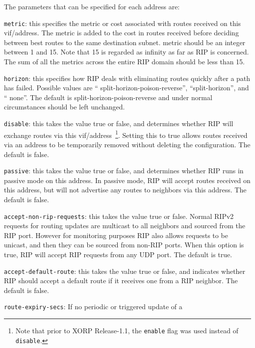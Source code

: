 \begin{description}
  The parameters that can be specified for each address are:
\begin{description}
\item{\tt metric}: this specifies the metric or cost associated with
  routes received on this vif/address.  The metric is added to the
  cost in routes received before deciding between best routes to the
  same destination subnet.  {\stt metric} should be an integer between
  1 and 15.  Note that 15 is regarded as infinity as far as RIP is
  concerned.  The sum of all the metrics across the entire RIP domain
  should be less than 15.
\item{\tt horizon}: this specifies how RIP deals with eliminating
  routes quickly after a path has failed.  Possible values are ``{\stt
  split-horizon-poison-reverse}'', ``{\stt split-horizon}'', and ``{\stt
  none}''.  The default is {\stt split-horizon-poison-reverse} and under
  normal circumstances should be left unchanged.
\item{\tt disable}: this takes the value {\stt true} or {\stt false},
  and determines whether RIP will exchange routes via this
  vif/address~\footnote{Note
  that prior to XORP Release-1.1, the {\tt enable} flag was used instead of
  {\tt disable}.}.
  Setting this to {\stt true} allows routes received
  via an address to be temporarily removed without deleting the
  configuration.  The default is {\stt false}.
\item{\tt passive}: this takes the value {\stt true} or {\stt false},
  and determines whether RIP runs in passive mode on this address.  In
  passive mode, RIP will accept routes received on this address, but
  will not advertise any routes to neighbors via this address.  The
  default is {\stt false}.
\item{\tt accept-non-rip-requests}: this takes the value {\stt true}
  or {\stt false}.  Normal RIPv2 requests for routing updates are
  multicast to all neighbors and sourced from the RIP port.  However
  for monitoring purposes RIP also allows requests to be unicast, and
  then they can be sourced from non-RIP ports.  When this option is
  {\stt true}, RIP will accept RIP requests from any UDP port.  The
  default is {\stt true}.
\item{\tt accept-default-route}: this takes the value {\stt true} or
  {\stt false}, and indicates whether RIP should accept a default
  route if it receives one from a RIP neighbor.  The default is {\stt
  false}.
\item{\tt route-expiry-secs}: If no periodic or triggered update of a

\end{description}
\end{description}
